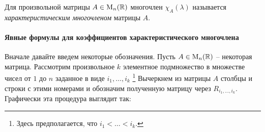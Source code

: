 \begin{definition}
Для произвольной матрицы $A\in\operatorname{M}_{n}(\mathbb R)$ многочлен $\chi_A(\lambda)$ называется {\it характеристическим многочленом} матрицы $A$.
\end{definition}


\paragraph{Явные формулы для коэффициентов характеристического многочлена}

Вначале давайте введем некоторые обозначения.
Пусть $A\in\operatorname{M}_{n}(\mathbb R)$ -- некоторая матрица.
Рассмотрим произвольное $k$ элементное подмножество в множестве чисел от $1$ до $n$ заданное в виде $i_1,\ldots, i_k$%
\footnote{Здесь предполагается, что $i_1 < \ldots < i_k$.}
Вычеркнем из матрицы $A$ столбцы и строки с этими номерами и обозначим полученную матрицу через $R_{i_1,\ldots,i_k}$.
Графически эта процедура выглядит так:
